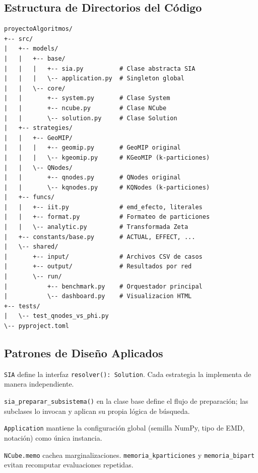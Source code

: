 \subsection{Estructura de Directorios del Código}

\begin{lstlisting}[caption={Árbol de directorios del proyecto.}]
proyectoAlgoritmos/
+-- src/
|   +-- models/
|   |   +-- base/
|   |   |   +-- sia.py          # Clase abstracta SIA
|   |   |   \-- application.py  # Singleton global
|   |   \-- core/
|   |       +-- system.py       # Clase System
|   |       +-- ncube.py        # Clase NCube
|   |       \-- solution.py     # Clase Solution
|   +-- strategies/
|   |   +-- GeoMIP/
|   |   |   +-- geomip.py       # GeoMIP original
|   |   |   \-- kgeomip.py      # KGeoMIP (k-particiones)
|   |   \-- QNodes/
|   |       +-- qnodes.py       # QNodes original
|   |       \-- kqnodes.py      # KQNodes (k-particiones)
|   +-- funcs/
|   |   +-- iit.py              # emd_efecto, literales
|   |   +-- format.py           # Formateo de particiones
|   |   \-- analytic.py         # Transformada Zeta
|   +-- constants/base.py       # ACTUAL, EFFECT, ...
|   \-- shared/
|       +-- input/              # Archivos CSV de casos
|       +-- output/             # Resultados por red
|       \-- run/
|           +-- benchmark.py    # Orquestador principal
|           \-- dashboard.py    # Visualizacion HTML
+-- tests/
|   \-- test_qnodes_vs_phi.py
\-- pyproject.toml
\end{lstlisting}

\subsection{Patrones de Diseño Aplicados}

\begin{description}[leftmargin=2cm, style=nextline]
    \item[\textbf{Strategy}] \texttt{SIA} define la interfaz \texttt{resolver(): Solution}. Cada estrategia la implementa de manera independiente.
    \item[\textbf{Template Method}] \texttt{sia\_preparar\_subsistema()} en la clase base define el flujo de preparación; las subclases lo invocan y aplican su propia lógica de búsqueda.
    \item[\textbf{Singleton}] \texttt{Application} mantiene la configuración global (semilla NumPy, tipo de EMD, notación) como única instancia.
    \item[\textbf{Memoización}] \texttt{NCube.memo} cachea marginalizaciones. \texttt{memoria\_kparticiones} y \texttt{memoria\_bipart} evitan recomputar evaluaciones repetidas.
\end{description}

